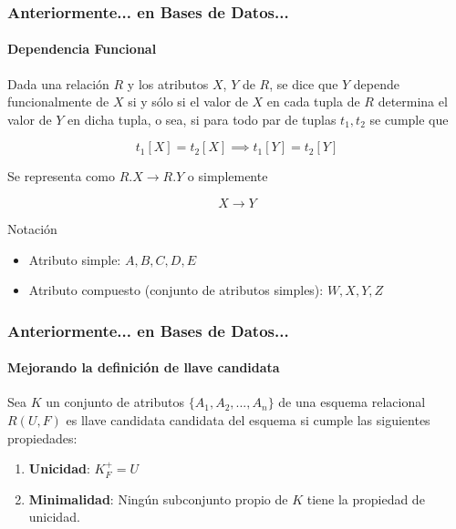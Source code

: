 \begin{frame}
    \frametitle{Anteriormente... en Bases de Datos...}
    \framesubtitle{Dependencia Funcional}
    
    Dada una relaci\'on $R$ y los atributos $X$, $Y$ de $R$, se dice que $Y$ depende funcionalmente de $X$ si
    y s\'olo si el valor de $X$ en cada tupla de $R$ determina el valor
    de $Y$ en dicha tupla, o sea, si para todo par de tuplas $t_1, t_2$ se cumple que 
    
            $$
            t_1[X] = t_2[X] \implies t_1[Y] = t_2[Y] 
            $$

    Se representa como $R.X \to R.Y$ o simplemente

    \begin{Huge}
        
        $$
            X \to Y
        $$
    \end{Huge}

    \begin{block}{Notaci\'on}
        \begin{itemize}
            \item Atributo simple: $A,B,C,D,E$
            \item Atributo compuesto (conjunto de atributos simples): $W,X,Y,Z$
        \end{itemize}
    \end{block}
\end{frame}

\begin{frame}
    \frametitle{Anteriormente... en Bases de Datos...}
    \framesubtitle{Mejorando la definici\'on de llave candidata}

    Sea $K$ un conjunto de atributos $\{A_1, A_2, ..., A_n\}$ de una esquema
    relacional $R(U,F)$ es llave candidata candidata del esquema
    si cumple las siguientes propiedades:
    \begin{enumerate}
        \item \textbf{Unicidad}: $K^+_F = U$
        \item \textbf{Minimalidad}: Ning\'un subconjunto propio de $K$ tiene la propiedad de unicidad.
    \end{enumerate}

    

\end{frame}